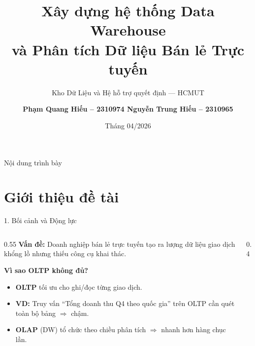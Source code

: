 \documentclass[10pt, aspectratio=169]{beamer}
\title{Xây dựng hệ thống Data Warehouse \\ và Phân tích Dữ liệu Bán lẻ Trực tuyến}
\subtitle{Kho Dữ Liệu và Hệ hỗ trợ quyết định --- HCMUT}
\author{\textbf{Phạm Quang Hiếu -- 2310974 \quad Nguyễn Trung Hiếu -- 2310965}}
\institute{GVHD: Bùi Tiến Đức}
\date{Tháng 04/2026}
\begin{document}
\maketitle

\begin{frame}{Nội dung trình bày}
    \tableofcontents
\end{frame}

\section{Giới thiệu đề tài}

\begin{frame}{1. Bối cảnh và Động lực}
    \small
    \begin{columns}[T]
        \begin{column}{0.55\textwidth}
            \textbf{Vấn đề:} Doanh nghiệp bán lẻ trực tuyến tạo ra lượng dữ liệu giao dịch khổng lồ nhưng thiếu công cụ khai thác.
            
            \vspace{0.2cm}
            \textbf{Vì sao OLTP không đủ?}
            \begin{itemize}
                \item \textbf{OLTP} tối ưu cho ghi/đọc từng giao dịch.
                \item \textbf{VD:} Truy vấn ``Tổng doanh thu Q4 theo quốc gia'' trên OLTP cần quét toàn bộ bảng $\Rightarrow$ chậm.
                \item \textbf{OLAP} (DW) tổ chức theo chiều phân tích $\Rightarrow$ nhanh hơn hàng chục lần.
            \end{itemize}
        \end{column}
        
        \begin{column}{0.4\textwidth}
            \begin{center}
\end{center}
\end{column}
\end{columns}
\end{frame}
\end{document}

